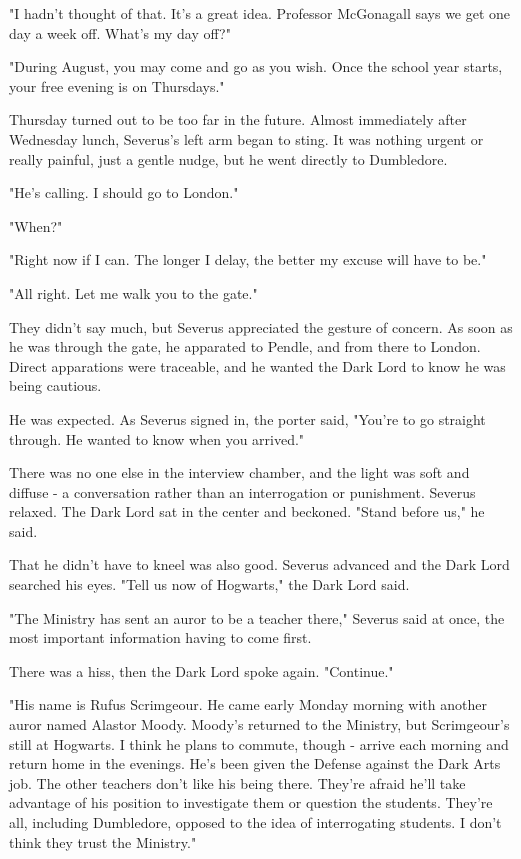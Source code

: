 \documentclass[a4paper,11pt]{article}
\begin{document}
"I hadn't thought of that. It's a great idea. Professor McGonagall says we get one day a week off. What's my day off?"

"During August, you may come and go as you wish. Once the school year starts, your free evening is on Thursdays."

Thursday turned out to be too far in the future. Almost immediately after Wednesday lunch, Severus's left arm began to sting. It was nothing urgent or really painful, just a gentle nudge, but he went directly to Dumbledore.

"He's calling. I should go to London."

"When?"

"Right now if I can. The longer I delay, the better my excuse will have to be."

"All right. Let me walk you to the gate."

They didn't say much, but Severus appreciated the gesture of concern. As soon as he was through the gate, he apparated to Pendle, and from there to London. Direct apparations were traceable, and he wanted the Dark Lord to know he was being cautious.

He was expected. As Severus signed in, the porter said, "You're to go straight through. He wanted to know when you arrived."

There was no one else in the interview chamber, and the light was soft and diffuse - a conversation rather than an interrogation or punishment. Severus relaxed. The Dark Lord sat in the center and beckoned. "Stand before us," he said.

That he didn't have to kneel was also good. Severus advanced and the Dark Lord searched his eyes. "Tell us now of Hogwarts," the Dark Lord said.

"The Ministry has sent an auror to be a teacher there," Severus said at once, the most important information having to come first.

There was a hiss, then the Dark Lord spoke again. "Continue."

"His name is Rufus Scrimgeour. He came early Monday morning with another auror named Alastor Moody. Moody's returned to the Ministry, but Scrimgeour's still at Hogwarts. I think he plans to commute, though - arrive each morning and return home in the evenings. He's been given the Defense against the Dark Arts job. The other teachers don't like his being there. They're afraid he'll take advantage of his position to investigate them or question the students. They're all, including Dumbledore, opposed to the idea of interrogating students. I don't think they trust the Ministry."
\end{document}
